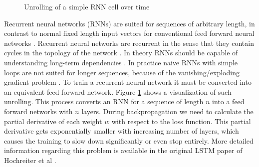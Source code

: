 \documentclass[draft,final,oneside]{vutinfth} %
\begin{document}
\begin{figure}[ht]
	
	\caption{Unrolling of a simple RNN cell over time \cite{colahlstm}}
	\label{fig:rnn}
\end{figure}

Recurrent neural networks (RNNs) are suited for sequences of arbitrary length, in contrast to normal fixed length input vectors for conventional feed forward neural networks \cite{hochreiter}. Recurrent neural networks are recurrent in the sense that they contain cycles in the topology of the network  \cite{deeplearninginneuralnetworks}. In theory RNNs should be capable of understanding long-term dependencies \cite{hochreiter}. In practice naive RNNs with simple loops are not suited for longer sequences, because of the vanishing/exploding gradient problem \cite{hochreiter}. To train a recurrent neural network it must be converted into an equivalent feed forward network. Figure \ref{fig:rnn} shows a visualization of such unrolling. This process converts an RNN for a sequence of length $n$ into a feed forward networks with $n$ layers. During backpropagation we need to calculate the partial derivative of each weight $w$ with respect to the loss function. This partial derivative gets exponentially smaller with increasing number of layers, which causes the training to slow down significantly or even stop entirely. More detailed information regarding this problem is available in the original LSTM paper of Hochreiter et al \cite{hochreiter}. 
\end{document}
